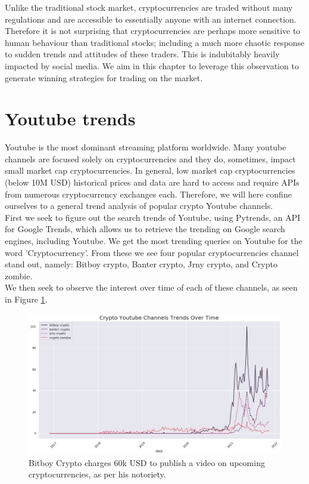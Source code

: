 \documentclass[twoside]{report}
\begin{document}
\begin{spacing}{1}
Unlike the traditional stock market, cryptocurrencies are traded without many regulations and are accessible to essentially anyone with an internet connection. Therefore it is not surprising that cryptocurrencies are perhaps more sensitive to human behaviour than traditional stocks; including a much more chaotic response to sudden trends and attitudes of these traders. This is indubitably heavily impacted by social media. We aim in this chapter to leverage this observation to generate winning strategies for trading on the market. 

\section{Youtube trends}

Youtube is the most dominant streaming platform worldwide. Many youtube channels are focused solely on cryptocurrencies and they do, sometimes, impact small market cap cryptocurrencies. In general, low market cap cryptocurrencies (below 10M USD) historical prices and data are hard to access and require APIs from numerous cryptocurrency exchanges each. Therefore, we will here confine ourselves to a general trend analysis of popular crypto Youtube channels.\\

First we seek to figure out the search trends of Youtube, using Pytrends, an API for Google Trends, which allows us to retrieve the trending on Google search engines, including Youtube. We get the most trending queries on Youtube for the word 'Cryptocurrency'. From these we see four popular cryptocurrencies channel stand out, namely: Bitboy crypto, Banter crypto, Jrny crypto, and Crypto zombie.\\

We then seek to observe the interest over time of each of these channels, as seen in Figure \ref{youtube_channel_crypto_trends}.

\begin{figure}[!htbp]
    \centering
    \includegraphics[scale = 0.5]{Images/youtube_channel_crypto_trends.png}
    \caption{Bitboy Crypto charges 60k USD to publish a video on upcoming cryptocurrencies, as per his notoriety.}
    \label{youtube_channel_crypto_trends}
\end{figure}



\end{spacing}
\end{document}
